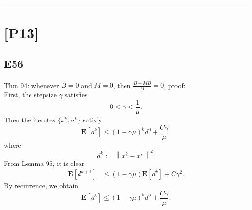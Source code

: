 \documentclass[12pt]{article}
\begin{document}
\hrule
\vspace{0.1cm}
\section*{[P13]}
\subsection*{E56}
Thm 94: whenever $B=0$ and $M=0$, then $\frac{B+M\tilde{B}}{M} = 0$, proof:\\
First, the stepsize $\gamma$ satisfies
\begin{equation}
    0 < \gamma < \frac{1}{\mu}.
    \label{eq:94gamma}
\end{equation}
Then the iterates $\{x^k, \sigma^k\}$ satisfy
\begin{equation}
    \mathbf{E}[d^k] \leq (1-\gamma\mu)^k d^0 + \frac{C\gamma}{\mu}.
    \label{eq:94iterate}
\end{equation}
where
\begin{equation}
    d^k := \left\| x^k - x^\star \right\|^2.
\end{equation}
From Lemma 95, it is clear
\begin{equation*}
    \begin{split}
        \mathbf{E}[d^{k+1}] &\leq (1-\gamma\mu)\mathbf{E}[d^k] + C\gamma^2.
    \end{split}
\end{equation*}
By recurrence, we obtain
\begin{equation*}
    \mathbf{E}[d^{k}] \leq (1-\gamma\mu)^k d^0 + \frac{C\gamma}{\mu}.
\end{equation*}
\end{document}
